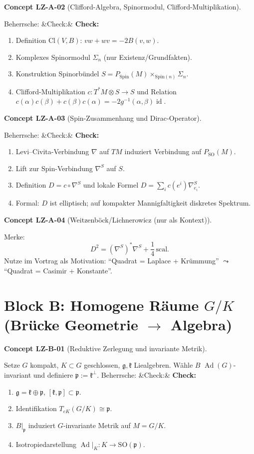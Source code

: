 \documentclass[10pt, letterpaper]{article}
\newcommand{\id}{\operatorname{id}}
\newcommand{\Ad}{\operatorname{Ad}}
\newcommand{\Cl}{\mathrm{Cl}}
\newcommand{\SO}{\mathrm{SO}}
\newcommand{\Spin}{\mathrm{Spin}}
\newenvironment{romanenum}[1][]
  {%
    \ifx&#1&
    \else
      \textbf{#1}\quad
    \fi
    \begin{enumerate}[label=\roman*)]
  }
  {%
    \end{enumerate}%
  }
\newcommand{\CustomHeading}[3]{%
  \par\medskip\noindent%
  \textbf{#1 #2} \textnormal{(#3)}.\enskip%
}
\newenvironment{CONC}[2]{\begin{unitbox}\CustomHeading{Concept}{#1}{#2}}{\end{unitbox}}
\begin{document}
\begin{CONC}{LZ-A-02}{Clifford-Algebra, Spinormodul, Clifford-Multiplikation}
Beherrsche:
\begin{romanenum}[Check:]
\item Definition $\Cl(V,B)$: $vw+wv=-2B(v,w)$.
\item Komplexes Spinormodul $\Sigma_n$ (nur Existenz/Grundfakten).
\item Konstruktion Spinorb\"undel $S=P_{\Spin}(M)\times_{\Spin(n)}\Sigma_n$.
\item Clifford-Multiplikation $c:T^*M\otimes S\to S$ und Relation $c(\alpha)c(\beta)+c(\beta)c(\alpha)=-2g^{-1}(\alpha,\beta)\id$.
\end{romanenum}
\end{CONC}

\begin{CONC}{LZ-A-03}{Spin-Zusammenhang und Dirac-Operator}
Beherrsche:
\begin{romanenum}[Check:]
\item Levi--Civita-Verbindung $\nabla$ auf $TM$ induziert Verbindung auf $P_{\SO}(M)$.
\item Lift zur Spin-Verbindung $\nabla^S$ auf $S$.
\item Definition $D=c\circ \nabla^S$ und lokale Formel $D=\sum_i c(e^i)\nabla^S_{e_i}$.
\item Formal: $D$ ist elliptisch; auf kompakter Mannigfaltigkeit diskretes Spektrum.
\end{romanenum}
\end{CONC}

\begin{CONC}{LZ-A-04}{Weitzenb\"ock/Lichnerowicz (nur als Kontext)}
Merke:
\[
D^2 = (\nabla^S)^*\nabla^S + \frac14\,\mathrm{scal}.
\]
Nutze im Vortrag als Motivation: ``Quadrat = Laplace + Kr\"ummung'' $\leadsto$ ``Quadrat = Casimir + Konstante''.
\end{CONC}

\section{Block B: Homogene R\"aume $G/K$ (Br\"ucke Geometrie $\to$ Algebra)}

\begin{CONC}{LZ-B-01}{Reduktive Zerlegung und invariante Metrik}
Setze $G$ kompakt, $K\subset G$ geschlossen, $\mathfrak g,\mathfrak k$ Liealgebren.
W\"ahle $B$ $\Ad(G)$-invariant und definiere $\mathfrak p:=\mathfrak k^\perp$.
Beherrsche:
\begin{romanenum}[Check:]
\item $\mathfrak g=\mathfrak k\oplus \mathfrak p$, $[\mathfrak k,\mathfrak p]\subset \mathfrak p$.
\item Identifikation $T_{eK}(G/K)\cong \mathfrak p$.
\item $B|_{\mathfrak p}$ induziert $G$-invariante Metrik auf $M=G/K$.
\item Isotropiedarstellung $\Ad|_K:K\to \SO(\mathfrak p)$.
\end{romanenum}
\end{CONC}
\end{document}
